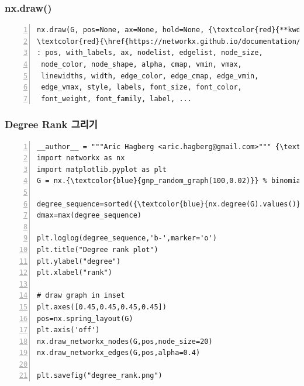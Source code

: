\documentclass{beamer}
\newcommand{\fbckg}[1]{\usebackgroundtemplate{\texttt{[image: \#1]}}}%
\begin{document}
\begin{frame}[fragile]
\frametitle{nx.draw()}
\begin{block}{}
	\begin{Verbatim}[numbers=left,commandchars=\\\{\}]
nx.draw(G, pos=None, ax=None, hold=None, {\textcolor{red}{**kwds}})
\textcolor{red}{\href{https://networkx.github.io/documentation/latest/reference/generated/networkx.drawing.nx_pylab.draw_networkx.html#networkx.drawing.nx_pylab.draw_networkx}{kwds 문서 링크}}
: pos, with_labels, ax, nodelist, edgelist, node_size,
 node_color, node_shape, alpha, cmap, vmin, vmax,
 linewidths, width, edge_color, edge_cmap, edge_vmin,
 edge_vmax, style, labels, font_size, font_color,
 font_weight, font_family, label, ...
	\end{Verbatim}
\end{block}
\end{frame}

{
\fbckg{degree_distribution.png}
\begin{frame}[fragile]
\frametitle{Degree Rank 그리기}
\tiny\begin{Verbatim}[numbers=left,commandchars=\\\{\}]
__author__ = """Aric Hagberg <aric.hagberg@gmail.com>""" {\textcolor{red}{\href{http://networkx.github.io/documentation/latest/examples/drawing/degree_histogram.html}{문서 링크}}}
import networkx as nx
import matplotlib.pyplot as plt
G = nx.{\textcolor{blue}{gnp_random_graph(100,0.02)}} % binomial_graph 생성

degree_sequence=sorted({\textcolor{blue}{nx.degree(G).values()}},reverse=True) # Degree 리스트 값 생성
dmax=max(degree_sequence)

plt.loglog(degree_sequence,'b-',marker='o')
plt.title("Degree rank plot")
plt.ylabel("degree")
plt.xlabel("rank")

# draw graph in inset
plt.axes([0.45,0.45,0.45,0.45])
pos=nx.spring_layout(G)
plt.axis('off')
nx.draw_networkx_nodes(G,pos,node_size=20)
nx.draw_networkx_edges(G,pos,alpha=0.4)

plt.savefig("degree_rank.png")
\end{Verbatim}
\end{frame}
}
\end{document}
